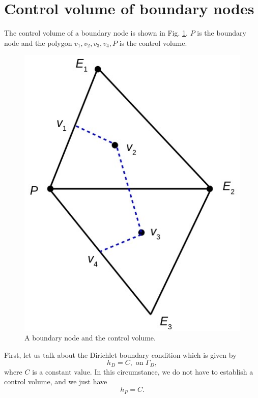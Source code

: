 \documentclass{article}        %
\begin{document}
\section{Control volume of boundary nodes}
The control volume of a boundary node is shown in Fig. \ref{boundary_control_volume}. $P$ is the boundary node and the polygon $v_1, v_2, v_3, v_4, P$ is the control volume.

\begin{figure}[htb]
	\centering
	\includegraphics[scale=0.4]{figures/BC_control_volume.jpg}
	\caption{A boundary node and the control volume.}
	\label{boundary_control_volume}
\end{figure}

First, let us talk about the Dirichlet boundary condition which is given by
\begin{equation}
	h_D = C, \text{ on } \Gamma_D,
\end{equation}
where $C$ is a constant value. In this circumstance, we do not have to establish a control volume, and we just have
\begin{equation}
	h_P = C.
\end{equation}
\end{document}
